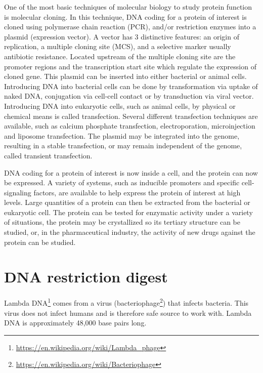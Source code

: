 \documentclass[]{book}
\let\rmarkdownfootnote\footnote%
\def\footnote{\protect\rmarkdownfootnote}
\renewcommand{\href}[2]{#2\footnote{\url{#1}}}
\theoremstyle{definition}
\theoremstyle{definition}
\theoremstyle{definition}
\theoremstyle{remark}
\begin{document}
One of the most basic techniques of molecular biology to study protein
function is molecular cloning. In this technique, DNA coding for a
protein of interest is cloned using polymerase chain reaction (PCR),
and/or restriction enzymes into a plasmid (expression vector). A vector
has 3 distinctive features: an origin of replication, a multiple cloning
site (MCS), and a selective marker usually antibiotic resistance.
Located upstream of the multiple cloning site are the promoter regions
and the transcription start site which regulate the expression of cloned
gene. This plasmid can be inserted into either bacterial or animal
cells. Introducing DNA into bacterial cells can be done by
transformation via uptake of naked DNA, conjugation via cell-cell
contact or by transduction via viral vector. Introducing DNA into
eukaryotic cells, such as animal cells, by physical or chemical means is
called transfection. Several different transfection techniques are
available, such as calcium phosphate transfection, electroporation,
microinjection and liposome transfection. The plasmid may be integrated
into the genome, resulting in a stable transfection, or may remain
independent of the genome, called transient transfection.

DNA coding for a protein of interest is now inside a cell, and the
protein can now be expressed. A variety of systems, such as inducible
promoters and specific cell-signaling factors, are available to help
express the protein of interest at high levels. Large quantities of a
protein can then be extracted from the bacterial or eukaryotic cell. The
protein can be tested for enzymatic activity under a variety of
situations, the protein may be crystallized so its tertiary structure
can be studied, or, in the pharmaceutical industry, the activity of new
drugs against the protein can be studied.

\section{DNA restriction digest}\label{dna-restriction-digest}

\href{https://en.wikipedia.org/wiki/Lambda_phage}{Lambda DNA} comes from
a virus
(\href{https://en.wikipedia.org/wiki/Bacteriophage}{bacteriophage}) that
infects bacteria. This virus does not infect humans and is therefore
safe source to work with. Lambda DNA is approximately 48,000 base pairs
long.
\end{document}
